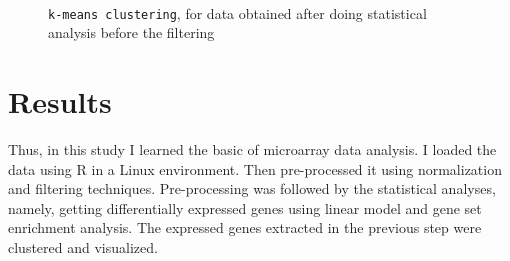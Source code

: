\documentclass[oneside, a4paper, 11pt]{book}
\begin{document}
\begin{figure}
    \centering
    \\%
    \caption{\texttt{k-means clustering}, for data obtained after doing statistical analysis before the filtering}
\end{figure}


\chapter{Results}
\markboth{}{}
Thus, in this study I learned the basic of microarray data analysis. I loaded the data using R in a Linux environment. Then pre-processed it using normalization and filtering techniques. Pre-processing was followed by the statistical analyses, namely, getting differentially expressed genes using linear model and gene set enrichment analysis. The expressed genes extracted in the previous step were clustered and visualized.
\end{document}
